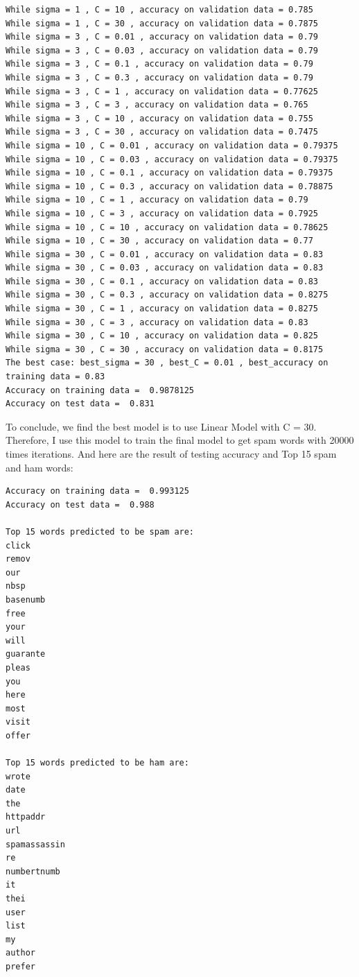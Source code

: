 \documentclass[paper=a4, fontsize=11pt]{scrartcl} %
\numberwithin{equation}{section} %
\numberwithin{figure}{section} %
\numberwithin{table}{section} %
\begin{document}
\begin{verbatim}
While sigma = 1 , C = 10 , accuracy on validation data = 0.785
While sigma = 1 , C = 30 , accuracy on validation data = 0.7875
While sigma = 3 , C = 0.01 , accuracy on validation data = 0.79
While sigma = 3 , C = 0.03 , accuracy on validation data = 0.79
While sigma = 3 , C = 0.1 , accuracy on validation data = 0.79
While sigma = 3 , C = 0.3 , accuracy on validation data = 0.79
While sigma = 3 , C = 1 , accuracy on validation data = 0.77625
While sigma = 3 , C = 3 , accuracy on validation data = 0.765
While sigma = 3 , C = 10 , accuracy on validation data = 0.755
While sigma = 3 , C = 30 , accuracy on validation data = 0.7475
While sigma = 10 , C = 0.01 , accuracy on validation data = 0.79375
While sigma = 10 , C = 0.03 , accuracy on validation data = 0.79375
While sigma = 10 , C = 0.1 , accuracy on validation data = 0.79375
While sigma = 10 , C = 0.3 , accuracy on validation data = 0.78875
While sigma = 10 , C = 1 , accuracy on validation data = 0.79
While sigma = 10 , C = 3 , accuracy on validation data = 0.7925
While sigma = 10 , C = 10 , accuracy on validation data = 0.78625
While sigma = 10 , C = 30 , accuracy on validation data = 0.77
While sigma = 30 , C = 0.01 , accuracy on validation data = 0.83
While sigma = 30 , C = 0.03 , accuracy on validation data = 0.83
While sigma = 30 , C = 0.1 , accuracy on validation data = 0.83
While sigma = 30 , C = 0.3 , accuracy on validation data = 0.8275
While sigma = 30 , C = 1 , accuracy on validation data = 0.8275
While sigma = 30 , C = 3 , accuracy on validation data = 0.83
While sigma = 30 , C = 10 , accuracy on validation data = 0.825
While sigma = 30 , C = 30 , accuracy on validation data = 0.8175
The best case: best_sigma = 30 , best_C = 0.01 , best_accuracy on training data = 0.83
Accuracy on training data =  0.9878125
Accuracy on test data =  0.831
\end{verbatim}
To conclude, we find the best model is to use Linear Model with C = 30. Therefore, I use this model to train the final model to get spam words with 20000 times iterations. And here are the result of testing accuracy and Top 15 spam and ham words:
\begin{verbatim}
Accuracy on training data =  0.993125
Accuracy on test data =  0.988

Top 15 words predicted to be spam are:
click
remov
our
nbsp
basenumb
free
your
will
guarante
pleas
you
here
most
visit
offer

Top 15 words predicted to be ham are:
wrote
date
the
httpaddr
url
spamassassin
re
numbertnumb
it
thei
user
list
my
author
prefer
\end{verbatim}
\end{document}

